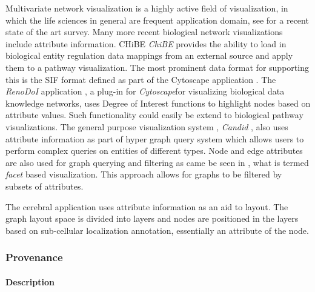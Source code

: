 Multivariate network visualization is a highly active field of visualization, in which the life sciences in general are frequent application domain, see \cite{} for a recent state of the art survey.
Many more recent biological network visualizations include attribute information.
CHiBE \textit{ChiBE}\cite{Babur2010chibe} provides the ability to load in biological entity regulation data mappings from an external source and apply them to a pathway visualization.
The most prominent data format for supporting this is the SIF format defined as part of the Cytoscape application \cite{Shannon2003cytoscape}.
The \textit{RenoDoI} application \cite{Vehlow2015}, a plug-in for \textit{Cytoscape}for visualizing biological data knowledge networks, uses Degree of Interest functions to highlight nodes based on attribute values.
Such functionality could easily be extend to biological pathway visualizations.
The general purpose visualization system , \textit{Candid} \cite{Shadoan2013}, also uses attribute information as part of hyper graph query system which allows users to perform complex queries on entities of different types.
Node and edge attributes are also used for graph querying and filtering as came be seen in , what is termed \textit{facet} based visualization. This approach allows for graphs to be filtered by subsets of attributes.

The cerebral application uses attribute information as an aid to layout. The graph layout space is divided into layers and nodes are positioned in the layers based  on sub-cellular localization annotation, essentially an attribute of the node.

\subsubsection{Provenance}

\paragraph{Description}

